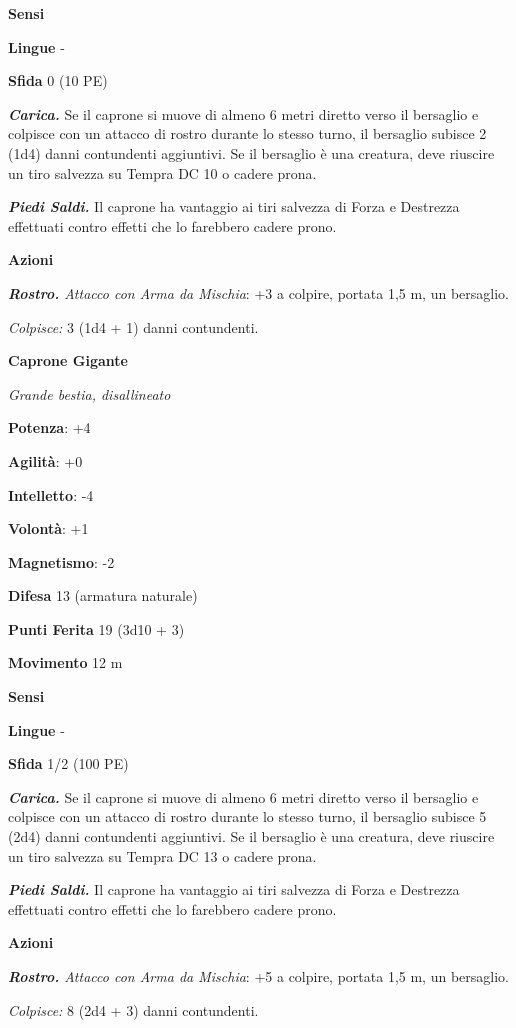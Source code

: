 \begin{multicols}{2}
\textbf{Sensi} 

\textbf{Lingue} -

\textbf{Sfida} 0 (10 PE)

\emph{\textbf{Carica.}} Se il caprone si muove di almeno 6 metri diretto
verso il bersaglio e colpisce con un attacco di rostro durante lo stesso
turno, il bersaglio subisce 2 (1d4) danni contundenti aggiuntivi. Se il
bersaglio è una creatura, deve riuscire un tiro salvezza su Tempra DC 10
o cadere prona.

\emph{\textbf{Piedi Saldi.}} Il caprone ha vantaggio ai tiri salvezza di
Forza e Destrezza effettuati contro effetti che lo farebbero cadere
prono.

\textbf{Azioni}

\emph{\textbf{Rostro.} Attacco con Arma da Mischia}: +3 a colpire,
portata 1,5 m, un bersaglio.

\emph{Colpisce:} 3 (1d4 + 1) danni contundenti.

\textbf{Caprone Gigante}

\emph{Grande bestia, disallineato}

\textbf{Potenza}: +4

\textbf{Agilità}: +0

\textbf{Intelletto}: -4

\textbf{Volontà}: +1

\textbf{Magnetismo}: -2

\textbf{Difesa} 13 (armatura naturale)

\textbf{Punti Ferita} 19 (3d10 + 3)

\textbf{Movimento} 12 m

\textbf{Sensi} 

\textbf{Lingue} -

\textbf{Sfida} 1/2 (100 PE)

\emph{\textbf{Carica.}} Se il caprone si muove di almeno 6 metri diretto
verso il bersaglio e colpisce con un attacco di rostro durante lo stesso
turno, il bersaglio subisce 5 (2d4) danni contundenti aggiuntivi. Se il
bersaglio è una creatura, deve riuscire un tiro salvezza su Tempra DC 13
o cadere prona.

\emph{\textbf{Piedi Saldi.}} Il caprone ha vantaggio ai tiri salvezza di
Forza e Destrezza effettuati contro effetti che lo farebbero cadere
prono.

\textbf{Azioni}

\emph{\textbf{Rostro.} Attacco con Arma da Mischia}: +5 a colpire,
portata 1,5 m, un bersaglio.

\emph{Colpisce:} 8 (2d4 + 3) danni contundenti.


\end{multicols}
